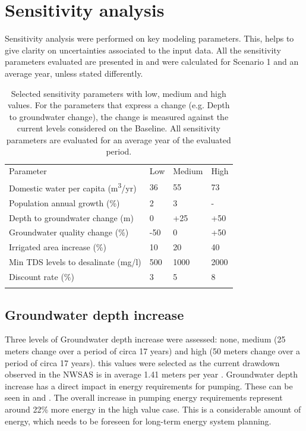 \documentclass[12pt]{iopart}
\begin{document}
\section{Sensitivity analysis}
Sensitivity analysis were performed on key modeling parameters. This, helps to give clarity on uncertainties associated to the input data. All the sensitivity parameters evaluated are presented in  and were calculated for Scenario 1 and an average year, unless stated differently.
\begin{table}[!ht]
	\caption{\label{tbl:sensitivity}Selected sensitivity parameters with low, medium and high values. For the parameters that express a change (e.g. Depth to groundwater change), the change is measured against the current levels considered on the Baseline. All sensitivity parameters are evaluated for an average year of the evaluated period.}
	\lineup
	\footnotesize
    \begin{tabular}{@{}l l l l}
			\br
			Parameter & Low & Medium & High\\
			\mr
			Domestic water per capita (m\textsuperscript{3}/yr) & 36 & 55 & 73\\
			Population annual growth (\%) & 2 & 3 & -\\
			Depth to groundwater change (m) & 0 & +25 & +50\\
			Groundwater quality change (\%) & -50 & 0 &  +50\\
			Irrigated area increase (\%) & 10 & 20 & 40\\
			Min TDS levels to desalinate (mg/l) & 500 & 1000 & 2000\\
			Discount rate (\%) & 3 & 5 & 8\\
			\br
	\end{tabular}
\end{table}

\subsection{Groundwater depth increase}
Three levels of Groundwater depth increase were assessed: none, medium (25 meters change over a period of circa 17 years) and high (50 meters change over a period of circa 17 years). this values were selected as the current drawdown observed in the NWSAS is in average 1.41 meters per year \cite{abuzeidNorthWesternSahara2015}. Groundwater depth increase has a direct impact in energy requirements for pumping. These can be seen in  and . The overall increase in pumping energy requirements represent around 22\% more energy in the high value case. This is a considerable amount of energy, which needs to be foreseen for long-term energy system planning.
\end{document}
